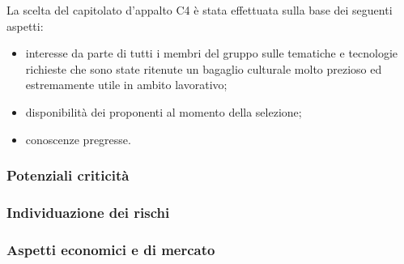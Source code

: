 La scelta del capitolato d’appalto C4 è stata effettuata sulla base dei seguenti aspetti:
\begin{itemize}
	\item interesse da parte di tutti i membri del gruppo sulle tematiche e tecnologie richieste che sono state ritenute un bagaglio culturale molto prezioso ed estremamente utile in ambito lavorativo;
	\item disponibilità dei proponenti al momento della selezione;
	\item conoscenze pregresse.
\end{itemize}

\subsubsection{Potenziali criticità}

\subsubsection{Individuazione dei rischi}

\subsubsection{ Aspetti economici e di mercato}

